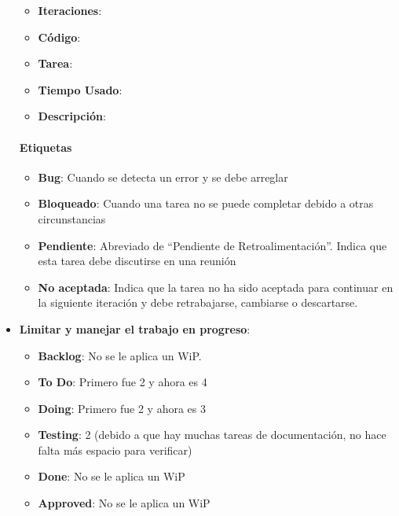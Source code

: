 \begin{itemize}
    \begin{itemize}
        \item \textbf{Iteraciones}:
        \item \textbf{Código}:
        \item \textbf{Tarea}:
        \item \textbf{Tiempo Usado}:
        \item \textbf{Descripción}:
    \end{itemize}

    \paragraph{Etiquetas}

    \begin{itemize}
        \item \textbf{Bug}: Cuando se detecta un error y se debe arreglar
        \item \textbf{Bloqueado}: Cuando una tarea no se puede completar debido a
        otras circunstancias
        \item \textbf{Pendiente}: Abreviado de “Pendiente de Retroalimentación”.
        Indica que esta tarea debe discutirse en una reunión
        \item \textbf{No aceptada}: Indica que la tarea no ha sido aceptada para
        continuar en la siguiente iteración y debe retrabajarse, cambiarse o
        descartarse.
    \end{itemize}

    \item \textbf{Limitar y manejar el trabajo en progreso}:
    \begin{itemize}
        \item \textbf{Backlog}: No se le aplica un WiP.
        \item \textbf{To Do}: Primero fue 2 y ahora es 4
        \item \textbf{Doing}: Primero fue 2 y ahora es 3
        \item \textbf{Testing}: 2 (debido a que hay muchas tareas de
        documentación, no hace falta más espacio para verificar)
        \item \textbf{Done}: No se le aplica un WiP
        \item \textbf{Approved}: No se le aplica un WiP
    \end{itemize}


\end{itemize}
